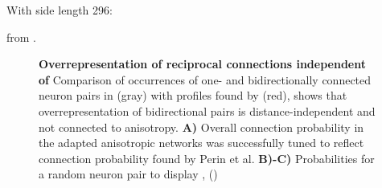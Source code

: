 With side length 296:


from .


\begin{figure}[htp]
  \centering
  \vspace{-0.6cm}
  \vspace{-0.15cm}
  \caption{\textbf{Overrepresentation of reciprocal connections
      independent of } Comparison of occurrences of one- and
    bidirectionally connected neuron pairs in (gray) with profiles
    found by \textcite{Perin2011} (red), shows that overrepresentation of
    bidirectional pairs is distance-independent and not connected to
    anisotropy.  \textbf{A)} Overall connection probability in the
    adapted anisotropic networks was successfully tuned to reflect
    connection probability found by Perin et al. \textbf{B)-C)}
    Probabilities for a random neuron pair to display , 
    ()} %
  \label{fig:perin_profiles_and_such}
\end{figure}


